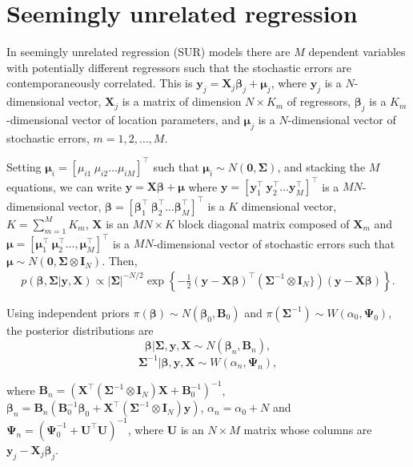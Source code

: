 \section{Seemingly unrelated regression}\label{sec72}

In seemingly unrelated regression (SUR) models there are $M$ dependent variables with potentially different regressors such that the stochastic errors are contemporaneously correlated. This is $\bm{y}_{j}=\bm{X}_{j}\bm{\beta}_j+\bm{\mu}_{j}$, where $\bm{y}_j$ is a $N$-dimensional vector, $\bm{X}_j$ is a matrix of dimension $N\times K_m$ of regressors, $\bm{\beta}_j$ is a $K_m$-dimensional vector of location parameters, and $\bm{\mu}_j$ is a $N$-dimensional vector of stochastic errors, $m=1,2,\dots,M$.
	
Setting $\bm{\mu}_i=\left[\mu_{i1} \ \mu_{i2} \dots \mu_{iM}\right]^{\top}$ such that $\bm{\mu}_i\sim{N}(\bm{0},\bm{\Sigma})$, and stacking the $M$ equations, we can write $\bm{y}=\bm{X}\bm{\beta}+\bm{\mu}$ where $\bm{y}=\left[\bm{y}_{1}^{\top} \ \bm{y}_{2}^{\top} \dots \bm{y}_{M}^{\top}\right]^{\top}$ is a $MN$-dimensional vector,  $\bm{\beta}=\left[\bm{\beta}_{1}^{\top} \ \bm{\beta}_{2}^{\top} \ldots \bm{\beta}_{M}^{\top}\right]^{\top}$ is a $ K$ dimensional vector, $K=\sum_{m=1}^{M} K_m$, $\bm{X}$ is an $MN\times K$ block diagonal matrix composed of $\bm{X}_{m}$ and $\bm{\mu}=\left[\bm{\mu}_{1}^{\top} \ \bm{\mu}_{2}^{\top} \dots ,\bm{\mu}_{M}^{\top}\right]^{\top}$ is a $MN$-dimensional vector of stochastic errors such that $\bm{\mu}\sim{N}(\bm{0},\bm{\Sigma}\otimes \bm{I}_N)$.
Then, 
\begin{align*}
	p(\bm{\beta},\bm{\Sigma}|\bm{y},\bm{X})\propto \left|\bm{\Sigma} \right|^{-N/2}\exp\left\{ -\frac{1}{2}(\bm{y}-\bm{X\beta})^{\top}(\bm{\Sigma}^{-1}\otimes \bm{I}_N\})(\bm{y}-\bm{X\beta})\right\}.
\end{align*}

Using independent priors $\pi(\bm{\beta})\sim{N}(\bm{\beta}_0,\bm{B}_0)$ and $\pi(\bm{\Sigma}^{-1})\sim{W}(\alpha_0,\bm{\Psi}_0)$, the posterior distributions are
\begin{equation*}
	\bm{\beta}|\bm{\Sigma}, \bm{y}, \bm{X} \sim {N}(\bm{\beta}_n, \bm{B}_n), 
\end{equation*}
\begin{equation*}
	\bm{\Sigma}^{-1}|\bm{\beta}, \bm{y}, \bm{X} \sim {W}(\alpha_n, \bm{\Psi}_n),
\end{equation*}

where $\bm{B}_n=(\bm{X}^{\top}(\bm{\Sigma}^{-1}\otimes \bm{I}_N )\bm{X}+\bm{B}_0^{-1})^{-1}$, $\bm{\beta}_n=\bm{B}_n(\bm{B}_0^{-1}\bm{\beta}_0 + \bm{X}^{\top}(\bm{\Sigma}^{-1}\otimes \bm{I}_N)\bm{y})$, $\alpha_n = \alpha_0 + N$ and $\bm{\Psi}_n = (\bm{\Psi}_0^{-1} + \bm{U}^{\top}\bm{U})^{-1}$, where $\bm{U}$ is an $N\times M$ matrix whose columns are $\bm{y}_j-\bm{X}_j\bm{\beta}_j$.

